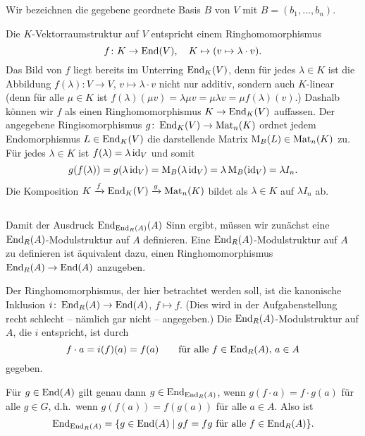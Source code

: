 \documentclass[a4paper, 10pt, numbers=noenddot]{scrartcl}
\begin{document}
\subsection{}

Wir bezeichnen die gegebene geordnete Basis $B$ von $V$ mit $B = (b_1, \dotsc, b_n)$.

Die $K$-Vektorraumstruktur auf $V$ entspricht einem Ringhomomorphismus
\[
  f \colon K \to \operatorname{End}(V),
  \quad
  K \mapsto (v \mapsto \lambda \cdot v).
\]
Das Bild von $f$ liegt bereits im Unterring $\operatorname{End}_K(V)$, denn für jedes $\lambda \in K$ ist die Abbildung $f(\lambda) \colon V \to V$, $v \mapsto \lambda \cdot v$ nicht nur additiv, sondern auch $K$-linear (denn für alle $\mu \in K$ ist $f(\lambda)(\mu v) = \lambda \mu v = \mu \lambda v = \mu f(\lambda)(v)$.)
Dashalb können wir $f$ als einen Ringhomomorphismus $K \to \operatorname{End}_K(V)$ auffassen.
Der angegebene Ringisomorphismus $g \colon \operatorname{End}_K(V) \to \operatorname{Mat}_n(K)$ ordnet jedem Endomorphismus $L \in \operatorname{End}_K(V)$ die darstellende Matrix $\operatorname{M}_B(L) \in \operatorname{Mat}_n(K)$ zu.
Für jedes $\lambda \in K$ ist $f(\lambda) = \lambda \operatorname{id}_V$ und somit
\[
    g(f(\lambda))
  = g(\lambda \operatorname{id}_V)
  = \operatorname{M}_B(\lambda \operatorname{id}_V)
  = \lambda \operatorname{M}_B(\operatorname{id}_V)
  = \lambda I_n.
\]
Die Komposition $K \xrightarrow{f} \operatorname{End}_K(V) \xrightarrow{g} \operatorname{Mat}_n(K)$ bildet als $\lambda \in K$ auf $\lambda I_n$ ab.





\subsection{}

Damit der Ausdruck $\operatorname{End}_{\operatorname{End}_R(A)}(A)$ Sinn ergibt, müssen wir zunächst eine $\operatorname{End}_R(A)$-Mo\-dul\-struk\-tur auf $A$ definieren.
Eine $\operatorname{End}_R(A)$-Modulstruktur auf $A$ zu definieren ist äquivalent dazu, einen Ringhomomorphismus $\operatorname{End}_R(A) \to \operatorname{End}(A)$ anzugeben.

Der Ringhomomorphismus, der hier betrachtet werden soll, ist die kanonische Inklusion $i \colon \operatorname{End}_R(A) \to \operatorname{End}(A)$, $f \mapsto f$.
(Dies wird in der Aufgabenstellung recht schlecht -- nämlich gar nicht -- angegeben.)
Die $\operatorname{End}_R(A)$-Modulstruktur auf $A$, die $i$ entspricht, ist durch
\[
    f \cdot a
  = i(f)(a)
  = f(a)
  \qquad
  \text{für alle $f \in \operatorname{End}_R(A)$, $a \in A$}
\]
gegeben.

Für $g \in \operatorname{End}(A)$ gilt genau dann $g \in \operatorname{End}_{\operatorname{End}_R(A)}$, wenn $g(f \cdot a) = f \cdot g(a)$ für alle $g \in G$, d.h.\ wenn $g(f(a)) = f(g(a))$ für alle $a \in A$.
Also ist
\[
    \operatorname{End}_{\operatorname{End}_R(A)}
  = \{ g \in \operatorname{End}(A) \mid \text{$gf = fg$ für alle $f \in \operatorname{End}_R(A)$} \}.
\]
\end{document}
